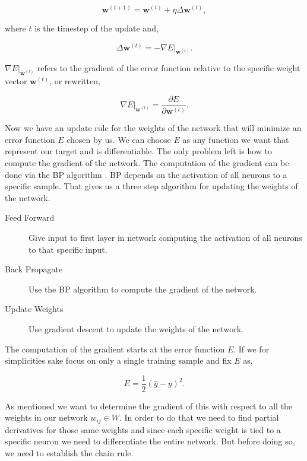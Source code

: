 \begin{equation} \label{eq:gradient_descent_network_update}
    \mathbf{w}^{(t+1)} = \mathbf{w}^{(t)} + \eta \Delta \mathbf{w}^{(t)},
\end{equation}

where $t$ is the timestep of the update and,

\begin{equation}
    \Delta \mathbf{w}^{(t)} = -\nabla E|_{\mathbf{w}^{(t)}}.
\end{equation}

$\nabla E|_{\mathbf{w}^{(t)}}$ refers to the gradient of the error function
relative to the specific weight vector $\mathbf{w}^{(t)}$, or rewritten,

\begin{equation}
    \nabla E|_{\mathbf{w}^{(t)}} = \frac{\partial E}{\partial \mathbf{w}^{(t)}}.
\end{equation}

Now we have an update rule for the weights of the network that will minimize
an error function $E$ chosen by us. We can choose $E$ as any function we want
that represent our target and is differentiable. The only problem left is how
to compute the gradient of the network. The computation of the gradient can be
done via the \gls{BP} algorithm \cite{Bishop}. \Gls{BP} depends on the
activation of all neurons to a specific sample. That gives us a three step
algorithm for updating the weights of the network.

\begin{description}
    \item[Feed Forward] Give input to first layer in network computing the
        activation of all neurons to that specific input.
    \item[Back Propagate] Use the \gls{BP} algorithm to compute the gradient of
        the network.
    \item[Update Weights] Use gradient descent to update the weights of the
        network.
\end{description}

The computation of the gradient starts at the error function $E$. If we for
simplicities sake focus on only a single training sample and fix $E$ as,

\begin{equation}
    E = \frac{1}{2}(\hat{y} - y)^2.
\end{equation}

As mentioned we want to determine the gradient of this with respect to all the
weights in our network $w_{ij} \in W$. In order to do that we need to find
partial derivatives for those same weights and since each specific weight is
tied to a specific neuron we need to differentiate the entire network. But
before doing so, we need to establish the chain rule.

